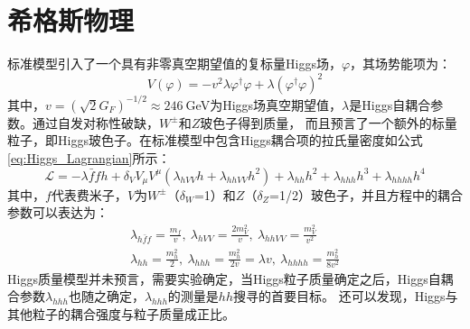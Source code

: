 \section{希格斯物理}
标准模型引入了一个具有非零真空期望值的复标量Higgs场，$\varphi$，其场势能项为：
\begin{equation}
 V(\varphi)=-v^2\lambda\varphi^{\dagger}\varphi+\lambda(\varphi^{\dagger}\varphi)^2
\end{equation}
其中，$v=(\sqrt{2}G_{F})^{-1/2}\approx246~$GeV为Higgs场真空期望值，$\lambda$是Higgs自耦合参数。通过自发对称性破缺，$W^{\pm}$和$Z$玻色子得到质量，
而且预言了一个额外的标量粒子，即Higgs玻色子。在标准模型中包含Higgs耦合项的拉氏量密度如公式\ref{eq:Higgs_Lagrangian}所示：
\begin{equation}
\label{eq:Higgs_Lagrangian}
\mathcal{L}=-\lambda\bar{f}fh+\delta_{V}V_{\mu}V^{\mu}(\lambda_{hVV}h+\lambda_{hhVV}h^2)+\lambda_{hh}h^2+\lambda_{hhh}h^3+\lambda_{hhhh}h^4
\end{equation}
其中，$f$代表费米子，$V$为$W^{\pm}$（$\delta_{W}$=1）和$Z$（$\delta_{Z}$=1/2）玻色子，并且方程中的耦合参数可以表达为：
\begin{equation}
 \begin{aligned}
 \lambda_{h\bar{f}f}=\frac{m_{f}}{v},~\lambda_{hVV}=\frac{2m_{V}^{2}}{v},~\lambda_{hhVV}=\frac{m_{V}^2}{v^2} \\
 \lambda_{hh}=\frac{m_{h}^2}{2},~\lambda_{hhh}=\frac{m_{h}^2}{2v}=\lambda v,~\lambda_{hhhh}=\frac{m_{h}^2}{8v^2}
 \end{aligned}
\end{equation}
Higgs质量模型并未预言，需要实验确定，当Higgs粒子质量确定之后，Higgs自耦合参数$\lambda_{hhh}$也随之确定，$\lambda_{hhh}$的测量是$hh$搜寻的首要目标。
还可以发现，Higgs与其他粒子的耦合强度与粒子质量成正比。

